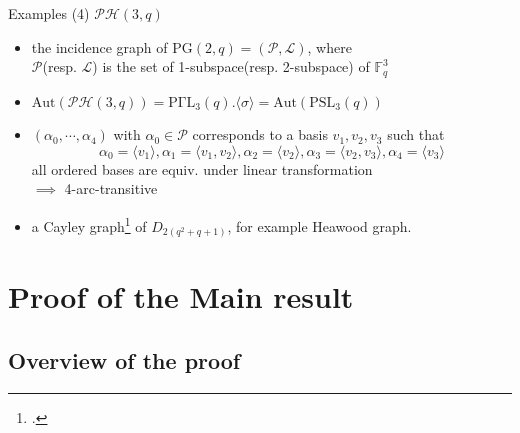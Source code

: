 \documentclass{beamer}
\def\PSL{\mathrm{PSL}}
\def\PGaL{\mathrm{P\Gamma L}}
\def\Aut{\mathrm{Aut}}
\def\PH{\mathcal{PH}}
\def\PG{\mathrm{PG}}
\begin{document}
\begin{frame}{Examples}
(4) $\mathcal{PH}(3,q)$
\begin{itemize}
	\item the incidence graph of $\PG(2,q)=(\mathcal{P,L})$, where \\$\mathcal{P}$(resp. $\mathcal{L}$) is the set of 1-subspace(resp. 2-subspace) of $\mathbb{F}_q^3$
	\item $\Aut(\PH(3,q))=\PGaL_3(q).\langle \sigma\rangle=\Aut(\PSL_3(q))$
	\item $(\alpha_0,\cdots,\alpha_4)$ with $\alpha_0\in \mathcal{P}$ corresponds to a basis $v_1,v_2,v_3$ such that\[ \alpha_0=\langle v_1\rangle, \alpha_1=\langle v_1,v_2\rangle, \alpha_2=\langle v_2\rangle, \alpha_3=\langle v_2,v_3\rangle, \alpha_4=\langle v_3\rangle \]all ordered bases are equiv. under linear transformation\\$\implies$ 4-arc-transitive
	\item a Cayley graph\footcite{MARUSIC2003162} of $D_{2(q^2+q+1)}$, for example Heawood graph.
\end{itemize}
\end{frame}


\section{Proof of the Main result}

\subsection{Overview of the proof}
\end{document}
